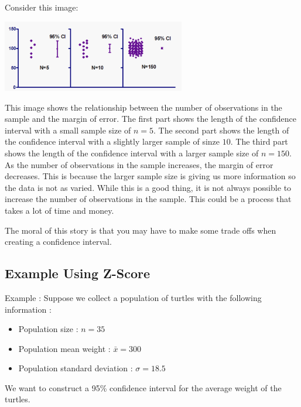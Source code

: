 \documentclass[
  letterpaper,
  DIV=11,
  numbers=noendperiod]{scrreprt}
\providecommand{\tightlist}{%
  \setlength{\itemsep}{0pt}\setlength{\parskip}{0pt}}\usepackage{longtable,booktabs,array}
\begin{document}
Consider this image:

\includegraphics[width=0.6\textwidth,height=\textheight]{./images/EPCI_3.jpg}

This image shows the relationship between the number of observations in
the sample and the margin of error. The first part shows the length of
the confidence interval with a small sample size of \(n=5\). The second
part shows the length of the confidence interval with a slightly larger
sample of sinze \(10\). The third part shows the length of the
confidence interval with a larger sample size of \(n=150\). As the
number of observations in the sample increases, the margin of error
decreases. This is because the larger sample size is giving us more
information so the data is not as varied. While this is a good thing, it
is not always possible to increase the number of observations in the
sample. This could be a process that takes a lot of time and money.

The moral of this story is that you may have to make some trade offs
when creating a confidence interval.

\subsection*{Example Using Z-Score}\label{example-using-z-score}

Example : Suppose we collect a population of turtles with the following
information :

\begin{itemize}
\tightlist
\item
  Population size : \(n=35\)
\item
  Population mean weight : \(\bar{x} = 300\)
\item
  Population standard deviation : \(\sigma = 18.5\)
\end{itemize}

We want to construct a 95\% confidence interval for the average weight
of the turtles.
\end{document}
